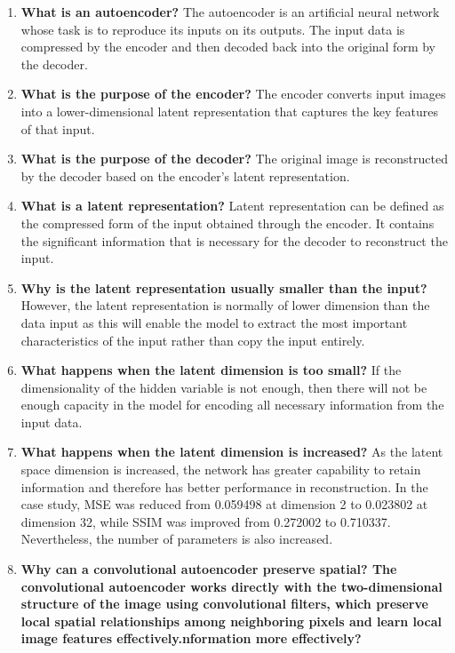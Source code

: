 \documentclass[10pt]{article}
\begin{document}
\begin{enumerate}

\item \textbf{What is an autoencoder?}
The autoencoder is an artificial neural network whose task is to reproduce its inputs on its outputs. The input data is compressed by the encoder and then decoded back into the original form by the decoder.
\item \textbf{What is the purpose of the encoder?}
The encoder converts input images into a lower-dimensional latent representation that captures the key features of that input. 

\item \textbf{What is the purpose of the decoder?}
The original image is reconstructed by the decoder based on the encoder’s latent representation.

\item \textbf{What is a latent representation?}
Latent representation can be defined as the compressed form of the input obtained through the encoder. It contains the significant information that is necessary for the decoder to reconstruct the input.
\item \textbf{Why is the latent representation usually smaller than the input?}
However, the latent representation is normally of lower dimension than the data input as this will enable the model to extract the most important characteristics of the input rather than copy the input entirely.

\item \textbf{What happens when the latent dimension is too small?}
If the dimensionality of the hidden variable is not enough, then there will not be enough capacity in the model for encoding all necessary information from the input data.
\item \textbf{What happens when the latent dimension is increased?}
As the latent space dimension is increased, the network has greater capability to retain information and therefore has better performance in reconstruction. In the case study, MSE was reduced from 0.059498 at dimension 2 to 0.023802 at dimension 32, while SSIM was improved from 0.272002 to 0.710337. Nevertheless, the number of parameters is also increased.

\item \textbf{Why can a convolutional autoencoder preserve spatial?
The convolutional autoencoder works directly with the two-dimensional structure of the image using convolutional filters, which preserve local spatial relationships among neighboring pixels and learn local image features effectively.nformation more effectively?}



\end{enumerate}
\end{document}
